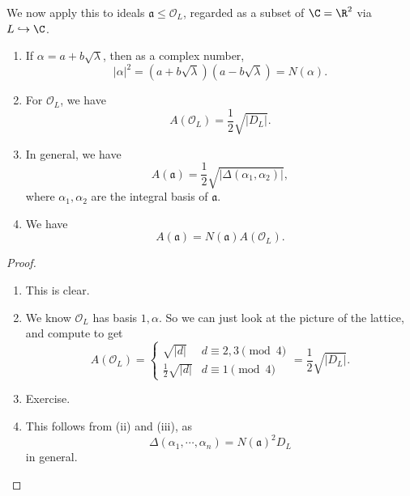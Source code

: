\documentclass[a4paper]{article}
\begin{document}
We now apply this to ideals $\mathfrak{a} \leq \mathcal{O}_L$, regarded as a subset of $\C = \R^2$ via $L \hookrightarrow \C$.

\begin{prop}\leavevmode
  \begin{enumerate}
    \item If $\alpha = a + b\sqrt{\lambda}$, then as a complex number,
      \[
        |\alpha|^2 = (a + b\sqrt{\lambda})(a - b\sqrt{\lambda}) = N(\alpha).
      \]
    \item For $\mathcal{O}_L$, we have
      \[
        A(\mathcal{O}_L) = \frac{1}{2}\sqrt{|D_L|}.
      \]
    \item In general, we have
      \[
        A(\mathfrak{a}) = \frac{1}{2} \sqrt{|\Delta(\alpha_1, \alpha_2)|},
      \]
      where $\alpha_1, \alpha_2$ are the integral basis of $\mathfrak{a}$.
    \item We have
      \[
        A(\mathfrak{a}) = N(\mathfrak{a}) A(\mathcal{O}_L).
      \]
  \end{enumerate}
\end{prop}

\begin{proof}\leavevmode
  \begin{enumerate}
    \item This is clear.
    \item We know $\mathcal{O}_L$ has basis $1, \alpha$. So we can just look at the picture of the lattice, and compute to get
      \[
        A(\mathcal{O}_L) =
        \begin{cases}
          \sqrt{|d|} & d \equiv 2, 3 \pmod 4\\
          \frac{1}{2}\sqrt{|d|} & d \equiv 1\pmod 4
        \end{cases} = \frac{1}{2}\sqrt{|D_L|}.
      \]
    \item Exercise. %
    \item This follows from (ii) and (iii), as
      \[
        \Delta(\alpha_1, \cdots, \alpha_n) = N(\mathfrak{a})^2 D_L
      \]
      in general.
  \end{enumerate}
\end{proof}
\end{document}
